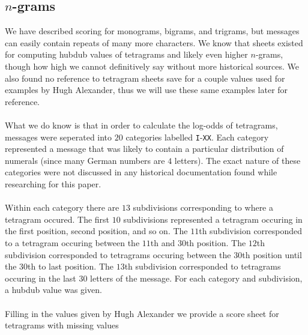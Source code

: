 \subsection{$n$-grams}
We have described scoring for monograms, bigrams, and trigrams, but messages can easily contain repeats of many more characters. We know that sheets existed for computing hubdub values of tetragrams and likely even higher $n$-grams, though how high we cannot definitively say without more historical sources. We also found no reference to tetragram sheets save for a couple values used for examples by Hugh Alexander, thus we will use these same examples later for reference.
\\\\What we do know is that in order to calculate the log-odds of tetragrams, messages were seperated into $20$ categories labelled \texttt{I}-\texttt{XX}. Each category represented a message that was likely to contain a particular distribution of numerals (since many German numbers are $4$ letters). The exact nature of these categories were not discussed in any historical documentation found while researching for this paper.
\\\\Within each category there are $13$ subdivisions corresponding to where a tetragram occured. The first $10$ subdivisions represented a tetragram occuring in the first position, second position, and so on. The $11$th subdivision corresponded to a tetragram occuring between the $11$th and $30$th position. The $12$th subdivision corresponded to tetragrams occuring between the $30$th position until the $30$th to last position. The $13$th subdivision corresponded to tetragrams occuring in the last $30$ letters of the message. For each category and subdivision, a hubdub value was given.
\\\\Filling in the values given by Hugh Alexander we provide a score sheet for tetragrams with missing values
